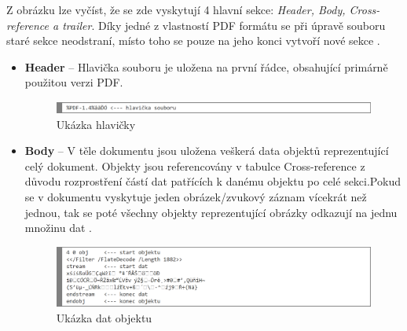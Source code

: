 Z obrázku lze vyčíst, že se zde vyskytují 4 hlavní sekce: \textit{Header, Body, Cross-reference a trailer}. Díky jedné z vlastností PDF formátu se při úpravě souboru staré sekce neodstraní, místo toho se pouze na jeho konci vytvoří nové sekce \cite{PDFInfoSec}.
\begin{itemize}
	\item \textbf{Header} -- Hlavička souboru je uložena na první řádce, obsahující primárně použitou verzi PDF.
	\begin{figure}[h!]
	\centering
	\includegraphics[width=15cm]{img/pdf_hlavicka}
	\caption{Ukázka hlavičky}
	\label{fig:pdf_header}
	\end{figure}
	
	\item \textbf{Body} -- V těle dokumentu jsou uložena veškerá data objektů reprezentující celý dokument. Objekty jsou referencovány v tabulce Cross-reference z důvodu rozprostření částí dat patřících k danému objektu po celé sekci.Pokud se v dokumentu vyskytuje jeden obrázek/zvukový záznam vícekrát než jednou, tak se poté všechny objekty reprezentující obrázky odkazují na jednu množinu dat \cite{PDFAdobe}.
	\begin{figure}[h!]
	\centering
	\includegraphics[width=15cm]{img/pdf_body}
	\caption{Ukázka dat objektu}
	\label{fig:pdf_body}
	\end{figure}


\end{itemize}
